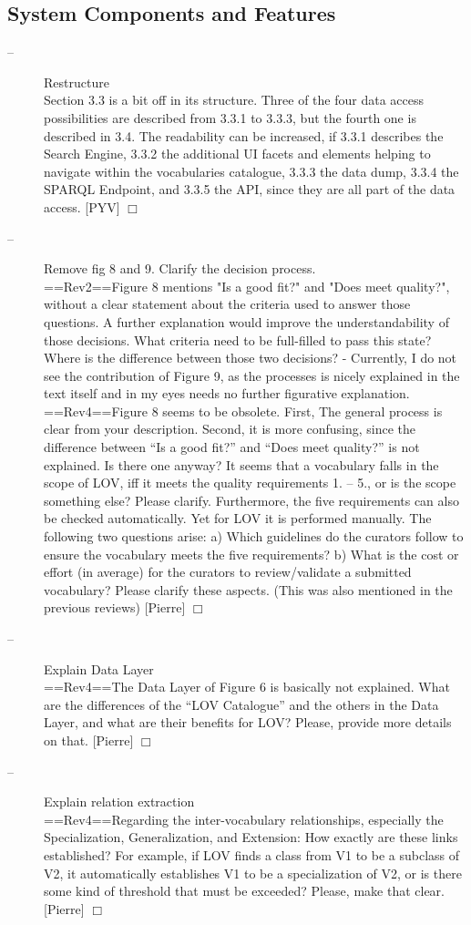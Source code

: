 \documentclass[a4paper,notitlepage]{article}
\newcommand\todo[2]{\item[--] #1 \hfill[#2] $\Box$}%
\begin{document}
\subsection{System Components and Features}
\begin{description}
 \todo{Restructure\\
Section 3.3 is a bit off in its structure. Three of the four data access possibilities are described from 3.3.1 to 3.3.3, but the fourth one is described in 3.4. The readability can be increased, if 3.3.1 describes the Search Engine, 3.3.2 the additional UI facets and elements helping to navigate within the vocabularies catalogue, 3.3.3 the data dump, 3.3.4 the SPARQL Endpoint, and 3.3.5 the API, since they are all part of the data access.}{PYV}

 \todo{Remove fig 8 and 9. Clarify the decision process. \\
==Rev2==Figure 8 mentions "Is a good fit?" and "Does meet quality?", without a clear statement about the criteria used to answer those questions. A further explanation would improve the understandability of those decisions. What criteria need to be full-filled to pass this state? Where is the difference between those two decisions?
- Currently, I do not see the contribution of Figure 9, as the processes is nicely explained in the text itself and in my eyes needs no further figurative explanation.\\
==Rev4==Figure 8 seems to be obsolete. First, The general process is clear from your description. Second, it is more confusing, since the difference between “Is a good fit?” and “Does meet quality?” is not explained. Is there one anyway? It seems that a vocabulary falls in the scope of LOV, iff it meets the quality requirements 1. – 5., or is the scope something else? Please clarify.
Furthermore, the five requirements can also be checked automatically. Yet for LOV it is performed manually. The following two questions arise: a) Which guidelines do the curators follow to ensure the vocabulary meets the five requirements? b) What is the cost or effort (in average) for the curators to review/validate a submitted vocabulary? Please clarify these aspects. (This was also mentioned in the previous reviews)}{Pierre}

 \todo{Explain Data Layer\\
==Rev4==The Data Layer of Figure 6 is basically not explained. What are the differences of the “LOV Catalogue” and the others in the Data Layer, and what are their benefits for LOV? Please, provide more details on that.}{Pierre}

 \todo{Explain relation extraction\\
==Rev4==Regarding the inter-vocabulary relationships, especially the Specialization, Generalization, and Extension: How exactly are these links established? For example, if LOV finds a class from V1 to be a subclass of V2, it automatically establishes V1 to be a specialization of V2, or is there some kind of threshold that must be exceeded? Please, make that clear.}{Pierre}

\end{description}
\end{document}
